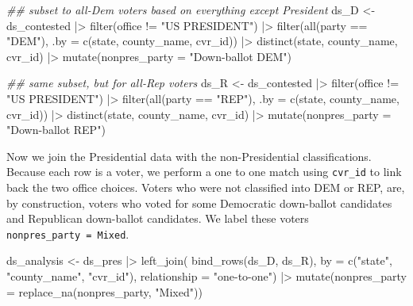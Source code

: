 \documentclass[fleqn,10pt]{wlscirep}
\newenvironment{Shaded}{\begin{snugshade}}{\end{snugshade}}
\newcommand{\AttributeTok}[1]{\textcolor[rgb]{0.40,0.45,0.13}{#1}}
\newcommand{\DocumentationTok}[1]{\textcolor[rgb]{0.37,0.37,0.37}{\textit{#1}}}
\newcommand{\FunctionTok}[1]{\textcolor[rgb]{0.28,0.35,0.67}{#1}}
\newcommand{\NormalTok}[1]{\textcolor[rgb]{0.00,0.23,0.31}{#1}}
\newcommand{\OtherTok}[1]{\textcolor[rgb]{0.00,0.23,0.31}{#1}}
\newcommand{\SpecialCharTok}[1]{\textcolor[rgb]{0.37,0.37,0.37}{#1}}
\newcommand{\StringTok}[1]{\textcolor[rgb]{0.13,0.47,0.30}{#1}}
\begin{document}
\begin{Shaded}
\begin{Highlighting}[]
\DocumentationTok{\#\# subset to all{-}Dem voters based on everything except President}
\NormalTok{ds\_D }\OtherTok{\textless{}{-}}\NormalTok{ ds\_contested }\SpecialCharTok{|\textgreater{}} 
  \FunctionTok{filter}\NormalTok{(office }\SpecialCharTok{!=} \StringTok{"US PRESIDENT"}\NormalTok{) }\SpecialCharTok{|\textgreater{}} 
  \FunctionTok{filter}\NormalTok{(}\FunctionTok{all}\NormalTok{(party }\SpecialCharTok{==} \StringTok{"DEM"}\NormalTok{), }\AttributeTok{.by =} \FunctionTok{c}\NormalTok{(state, county\_name, cvr\_id)) }\SpecialCharTok{|\textgreater{}} 
  \FunctionTok{distinct}\NormalTok{(state, county\_name, cvr\_id) }\SpecialCharTok{|\textgreater{}} 
  \FunctionTok{mutate}\NormalTok{(}\AttributeTok{nonpres\_party =} \StringTok{"Down{-}ballot DEM"}\NormalTok{)}

\DocumentationTok{\#\# same subset, but for all{-}Rep voters}
\NormalTok{ds\_R }\OtherTok{\textless{}{-}}\NormalTok{ ds\_contested }\SpecialCharTok{|\textgreater{}} 
  \FunctionTok{filter}\NormalTok{(office }\SpecialCharTok{!=} \StringTok{"US PRESIDENT"}\NormalTok{) }\SpecialCharTok{|\textgreater{}} 
  \FunctionTok{filter}\NormalTok{(}\FunctionTok{all}\NormalTok{(party }\SpecialCharTok{==} \StringTok{"REP"}\NormalTok{), }\AttributeTok{.by =} \FunctionTok{c}\NormalTok{(state, county\_name, cvr\_id)) }\SpecialCharTok{|\textgreater{}} 
  \FunctionTok{distinct}\NormalTok{(state, county\_name, cvr\_id) }\SpecialCharTok{|\textgreater{}} 
  \FunctionTok{mutate}\NormalTok{(}\AttributeTok{nonpres\_party =} \StringTok{"Down{-}ballot REP"}\NormalTok{)}
\end{Highlighting}
\end{Shaded}

Now we join the Presidential data with the non-Presidential
classifications. Because each row is a voter, we perform a one to one
match using \texttt{cvr\_id} to link back the two office choices. Voters
who were not classified into DEM or REP, are, by construction, voters
who voted for some Democratic down-ballot candidates and Republican
down-ballot candidates. We label these voters
\texttt{nonpres\_party\ =\ Mixed}.

\begin{Shaded}
\begin{Highlighting}[]
\NormalTok{ds\_analysis }\OtherTok{\textless{}{-}}\NormalTok{ ds\_pres }\SpecialCharTok{|\textgreater{}} 
  \FunctionTok{left\_join}\NormalTok{(}
    \FunctionTok{bind\_rows}\NormalTok{(ds\_D, ds\_R), }
    \AttributeTok{by =} \FunctionTok{c}\NormalTok{(}\StringTok{"state"}\NormalTok{, }\StringTok{"county\_name"}\NormalTok{, }\StringTok{"cvr\_id"}\NormalTok{), }\AttributeTok{relationship =} \StringTok{"one{-}to{-}one"}\NormalTok{) }\SpecialCharTok{|\textgreater{}} 
  \FunctionTok{mutate}\NormalTok{(}\AttributeTok{nonpres\_party =} \FunctionTok{replace\_na}\NormalTok{(nonpres\_party, }\StringTok{"Mixed"}\NormalTok{))}
\end{Highlighting}
\end{Shaded}
\end{document}
